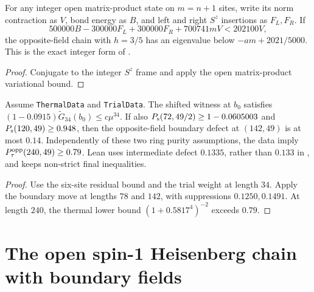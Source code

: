 \begin{lemma}
  \label{lem:boundary-trial-bridge}
  \leanok
  For any integer open matrix-product state on \(m=n+1\) sites, write its norm contraction
  as \(V\), bond energy as \(B\), and left and right \(S^z\) insertions as \(F_L,F_R\).
  If
  \[
    500000B-300000F_L+300000F_R+700741mV<202100V,
  \]
  the opposite-field chain with \(h=3/5\) has an eigenvalue below \(-am+2021/5000\).
  This is the exact integer form of \cite[Proposition B.1]{OpenAIBoundary}.
\end{lemma}
\begin{proof}
  \leanok
  Conjugate to the integer \(S^z\) frame and apply the open matrix-product variational bound.
\end{proof}

\begin{lemma}
  \label{lem:boundary-initialized}
  \leanok
  Assume \texttt{ThermalData} and \texttt{TrialData}.
  The shifted witness at \(b_0\) satisfies
  \((1-0.0915)\widetilde G_{34}(b_0)\le c\mu^{34}\).
  If also \(P_{\mathrm{s}}(72,49/2)\ge1-0.0605003\) and \(P_{\mathrm{s}}(120,49)\ge0.948\), then
  the opposite-field boundary defect at \((142,49)\) is at most \(0.14\).
  Independently of these two ring purity assumptions, the data imply
  \(P_{\tau}^{\mathrm{opp}}(240,49)\ge0.79\).
  Lean uses intermediate defect \(0.1335\), rather than \(0.133\) in
  \cite[Section 5.1]{OpenAIBoundary}, and keeps non-strict final inequalities.
\end{lemma}
\begin{proof}
  \leanok
  Use the six-site residual bound and the trial weight at length \(34\).
  Apply the boundary move at lengths \(78\) and \(142\), with suppressions \(0.1250,0.1491\).
  At length \(240\), the thermal lower bound \((1+0.5817^4)^{-2}\) exceeds \(0.79\).
\end{proof}

\section{The open spin-1 Heisenberg chain with boundary fields}

